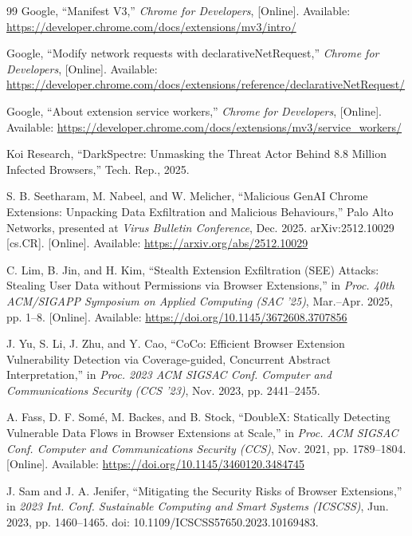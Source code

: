 \documentclass[12pt,oneside]{report}
\begin{document}
\begin{thebibliography}{99}
Google, 
``Manifest V3,'' 
\textit{Chrome for Developers}, 
[Online]. Available: \url{https://developer.chrome.com/docs/extensions/mv3/intro/}

Google, 
``Modify network requests with declarativeNetRequest,'' 
\textit{Chrome for Developers}, 
[Online]. Available: \url{https://developer.chrome.com/docs/extensions/reference/declarativeNetRequest/}

Google, 
``About extension service workers,'' 
\textit{Chrome for Developers}, 
[Online]. Available: \url{https://developer.chrome.com/docs/extensions/mv3/service_workers/}

Koi Research, 
``DarkSpectre: Unmasking the Threat Actor Behind 8.8 Million Infected Browsers,'' 
Tech. Rep., 2025.

S. B. Seetharam, M. Nabeel, and W. Melicher,
``Malicious GenAI Chrome Extensions: Unpacking Data Exfiltration and Malicious Behaviours,''
Palo Alto Networks, presented at \textit{Virus Bulletin Conference}, Dec. 2025.
arXiv:2512.10029 [cs.CR].
[Online]. Available: \url{https://arxiv.org/abs/2512.10029}

C. Lim, B. Jin, and H. Kim,
``Stealth Extension Exfiltration (SEE) Attacks: Stealing User Data without Permissions via Browser Extensions,''
in \textit{Proc. 40th ACM/SIGAPP Symposium on Applied Computing (SAC '25)},
Mar.--Apr. 2025, pp. 1--8.
[Online]. Available: \url{https://doi.org/10.1145/3672608.3707856}

J. Yu, S. Li, J. Zhu, and Y. Cao, 
``CoCo: Efficient Browser Extension Vulnerability Detection via Coverage-guided, 
Concurrent Abstract Interpretation,'' 
in \textit{Proc. 2023 ACM SIGSAC Conf. Computer and Communications Security (CCS '23)}, 
Nov. 2023, pp. 2441--2455.

A. Fass, D. F. Somé, M. Backes, and B. Stock,
``DoubleX: Statically Detecting Vulnerable Data Flows in Browser Extensions at Scale,''
in \textit{Proc. ACM SIGSAC Conf. Computer and Communications Security (CCS)},
Nov. 2021, pp. 1789--1804.
[Online]. Available: \url{https://doi.org/10.1145/3460120.3484745}

J. Sam and J. A. Jenifer,
``Mitigating the Security Risks of Browser Extensions,''
in \textit{2023 Int. Conf. Sustainable Computing and Smart Systems (ICSCSS)},
Jun. 2023, pp. 1460--1465.
doi: 10.1109/ICSCSS57650.2023.10169483.


\end{thebibliography}
\end{document}
